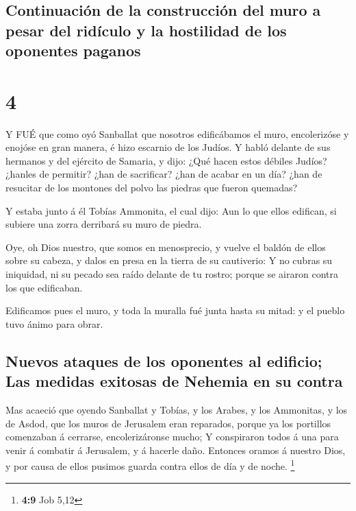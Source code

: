 \hypertarget{continuaciuxf3n-de-la-construcciuxf3n-del-muro-a-pesar-del-riduxedculo-y-la-hostilidad-de-los-oponentes-paganos}{%
\subsection{Continuación de la construcción del muro a pesar del
ridículo y la hostilidad de los oponentes
paganos}\label{continuaciuxf3n-de-la-construcciuxf3n-del-muro-a-pesar-del-riduxedculo-y-la-hostilidad-de-los-oponentes-paganos}}

\hypertarget{section-3}{%
\section{4}\label{section-3}}

 Y FUÉ que como oyó Sanballat que nosotros edificábamos el
muro, encolerizóse y enojóse en gran manera, é hizo escarnio de los
Judíos.  Y habló delante de sus hermanos y del ejército de
Samaria, y dijo: ¿Qué hacen estos débiles Judíos? ¿hanles de permitir?
¿han de sacrificar? ¿han de acabar en un día? ¿han de resucitar de los
montones del polvo las piedras que fueron quemadas?

 Y estaba junto á él Tobías Ammonita, el cual dijo: Aun lo
que ellos edifican, si subiere una zorra derribará su muro de piedra.

 Oye, oh Dios nuestro, que somos en menosprecio, y vuelve el
baldón de ellos sobre su cabeza, y dalos en presa en la tierra de su
cautiverio:  Y no cubras su iniquidad, ni su pecado sea
raído delante de tu rostro; porque se airaron contra los que edificaban.

 Edificamos pues el muro, y toda la muralla fué junta hasta
su mitad: y el pueblo tuvo ánimo para obrar.

\hypertarget{nuevos-ataques-de-los-oponentes-al-edificio-las-medidas-exitosas-de-nehemia-en-su-contra}{%
\subsection{Nuevos ataques de los oponentes al edificio; Las medidas
exitosas de Nehemia en su
contra}\label{nuevos-ataques-de-los-oponentes-al-edificio-las-medidas-exitosas-de-nehemia-en-su-contra}}

 Mas acaeció que oyendo Sanballat y Tobías, y los Arabes, y
los Ammonitas, y los de Asdod, que los muros de Jerusalem eran
reparados, porque ya los portillos comenzaban á cerrarse,
encolerizáronse mucho;  Y conspiraron todos á una para venir
á combatir á Jerusalem, y á hacerle daño.  Entonces oramos á
nuestro Dios, y por causa de ellos pusimos guarda contra ellos de día y
de noche. \footnote{\textbf{4:9} Job 5,12}

